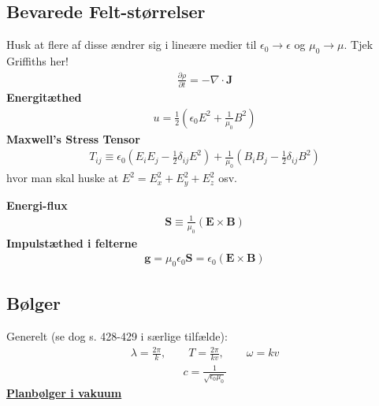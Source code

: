 \documentclass[a4paper]{article}
\begin{document}
    \subsection{Bevarede Felt-størrelser}
    Husk at flere af disse ændrer sig i lineære medier til \(\epsilon_0 \to \epsilon \) og \(\mu _0 \to \mu \). Tjek Griffiths her!
    \begin{align*} 
        \frac{\partial \rho }{\partial t} = - \nabla \cdot \mathbf{J}\tag{8.4}
    \end{align*}
    \textbf{Energitæthed}\begin{align*}
        u = \frac{1}{2} \left( \epsilon _0 E^2 + \frac{1}{\mu _0} B^{2}\right)  \tag{8.5}
    \end{align*} 
    \textbf{Maxwell's Stress Tensor}
    \begin{align*}
        T_{ij} \equiv \epsilon _0 \left( E_i E_j - \frac{1}{2} \delta_{ij} E^{2}\right) + \frac{1}{\mu _0}\left( B_i B_j - \frac{1}{2} \delta_{ij} B^{2}\right) \tag{8.17}
    \end{align*} 
    hvor man skal huske at \(E^{2} = E_x ^{2} + E_y ^{2} + E_z ^{2} \) osv. 

    \textbf{Energi-flux} 
    \begin{align*}
        \mathbf{S} \equiv \frac{1}{\mu _0} \left( \mathbf{E} \times \mathbf{B} \right) \tag{8.10}
    \end{align*}
    \textbf{Impulstæthed i felterne} \begin{align*}
        \mathbf{g} = \mu _0 \epsilon _0 \mathbf{S} = \epsilon _0 \left( \mathbf{E} \times \mathbf{B} \right)  \tag{8.29}
    \end{align*}  
    
    \subsection{Bølger}
    Generelt (se dog s. 428-429 i særlige tilfælde):
    \begin{align*}
        \lambda = \frac{2\pi}{k}, \qquad T = \frac{2\pi}{k v}, \qquad \boxed{\omega = kv}
    \end{align*}
    \begin{align*}
        \boxed{c = \frac{1}{\sqrt{\epsilon _0 \mu _0} }}
    \end{align*}
    \underline{\textbf{Planbølger i vakuum}}
\end{document}
